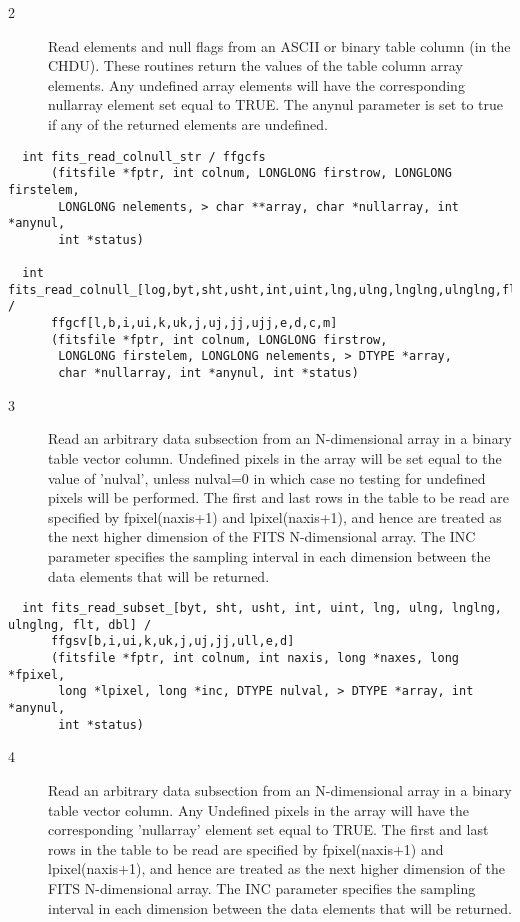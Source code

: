 \documentclass[11pt]{book}
\begin{document}
\begin{description}
\item[2 ] Read elements and null flags from an ASCII or binary table column (in the
    CHDU).  These routines return the values of the table column array elements.
    Any undefined array elements will have the corresponding nullarray element
    set equal to TRUE.  The anynul parameter is set to true if any of the
   returned elements are undefined. \label{ffgcfx}
\end{description}

\begin{verbatim}
  int fits_read_colnull_str / ffgcfs
      (fitsfile *fptr, int colnum, LONGLONG firstrow, LONGLONG firstelem,
       LONGLONG nelements, > char **array, char *nullarray, int *anynul,
       int *status)

  int fits_read_colnull_[log,byt,sht,usht,int,uint,lng,ulng,lnglng,ulnglng,flt,dbl,cmp,dblcmp] /
      ffgcf[l,b,i,ui,k,uk,j,uj,jj,ujj,e,d,c,m]
      (fitsfile *fptr, int colnum, LONGLONG firstrow,
       LONGLONG firstelem, LONGLONG nelements, > DTYPE *array,
       char *nullarray, int *anynul, int *status)
\end{verbatim}

\begin{description}
\item[3 ] Read an arbitrary data subsection from an N-dimensional array
    in a binary table vector column.  Undefined pixels
    in the array will be set equal to the value of 'nulval',
    unless nulval=0 in which case no testing for undefined pixels will
    be performed.  The first and last rows in the table to be read
    are specified by fpixel(naxis+1) and lpixel(naxis+1), and hence
    are treated as the next higher dimension of the FITS N-dimensional
    array.  The INC parameter specifies the sampling interval in
   each dimension between the data elements that will be returned. \label{ffgsvx2}
\end{description}

\begin{verbatim}
  int fits_read_subset_[byt, sht, usht, int, uint, lng, ulng, lnglng, ulnglng, flt, dbl] /
      ffgsv[b,i,ui,k,uk,j,uj,jj,ull,e,d]
      (fitsfile *fptr, int colnum, int naxis, long *naxes, long *fpixel,
       long *lpixel, long *inc, DTYPE nulval, > DTYPE *array, int *anynul,
       int *status)
\end{verbatim}

\begin{description}
\item[4 ] Read an arbitrary data subsection from an N-dimensional array
    in a binary table vector column.  Any Undefined
    pixels in the array will have the corresponding 'nullarray'
    element set equal to TRUE.  The first and last rows in the table
    to be read are specified by fpixel(naxis+1) and lpixel(naxis+1),
    and hence are treated as the next higher dimension of the FITS
    N-dimensional array.  The INC parameter specifies the sampling
    interval in each dimension between the data elements that will be
   returned. \label{ffgsfx2}
\end{description}
\end{document}
